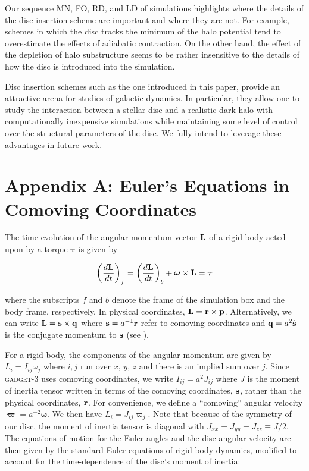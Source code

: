 Our sequence MN, FO, RD, and LD of simulations highlights where the
details of the disc insertion scheme are important and where they are
not.  For example, schemes in which the disc tracks the minimum of the
halo potential tend to overestimate the effects of adiabatic
contraction.  On the other hand, the effect of the depletion of halo
substructure seems to be rather insensitive to the details of how the
disc is introduced into the simulation.


Disc insertion schemes such as the one introduced in this paper,
provide an attractive arena for
studies of galactic dynamics. In particular, they allow one to study the interaction between a stellar disc and a realistic dark halo with computationally inexpensive simulations while maintaining some level of control over the structural parameters of the disc.  We fully intend to leverage these advantages in future work.


\section*{Appendix A: Euler's Equations in Comoving Coordinates} \label{sec:derivation}

The time-evolution of the angular momentum vector ${\bf L}$ of a rigid
body acted upon by a torque $\boldsymbol{\tau}$ is given by

\begin{equation}
  \left(\frac{{d} \bf{L}}{{d} t}\right)_f = \left(\frac{{d} \bf{L}}{{d} t}\right)_b  + \boldsymbol \omega \times \bf{L}
  = \boldsymbol{\tau}
\end{equation}

\noindent where the subscripts $f$ and $b$ denote the frame of the
simulation box and the body frame, respectively.  In physical
coordinates, ${\bf L} = {\bf r \times p}$.  Alternatively, we can
write ${\bf L} = {\bf s\times q}$ where ${\bf s} = a^{-1}{\bf r}$
refer to comoving coordinates and ${\bf q} = a^2\dot{\bf s}$ is the
conjugate momentum to ${\bf s}$ (see \citet{QuinnIntegrators}).

For a rigid body, the components of the angular momentum are given by $L_i = I_{ij} \omega_j$ where $i,j$ run over $x,\,y,\,z$ and there is an implied sum over $j$.  Since \textsc{gadget-3} uses comoving coordinates, we write $I_{ij} = a^2 J_{ij}$ where $J$ is the moment of inertia tensor written in terms of the comoving coordinates, ${\bf s}$, rather than the physical coordinates, ${\bf r}$.  For convenience, we define a ``comoving'' angular velocity $\boldsymbol{\varpi} = a^{-2}\boldsymbol{\omega}$.  We then have $L_i = J_{ij} \varpi_j$.  Note that because of the symmetry of our disc, the moment of inertia tensor is diagonal with $J_{xx} = J_{yy}= J_{zz} \equiv J/2$.  The equations of motion for the Euler angles and the disc angular velocity are then given by the standard Euler equations of rigid body dynamics, modified to account for the time-dependence of the disc's moment of inertia:

